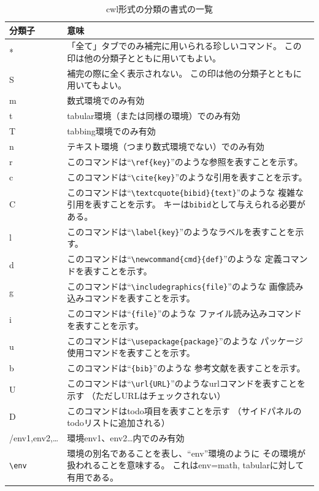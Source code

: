 \begin{table}[H]
  \centering
  \caption{cwl形式の分類の書式の一覧}
  \begin{tabularx}{\linewidth}{lX}
    \hline
    \textbf{分類子} & \textbf{意味}\\
    \hline
    * & 「全て」タブでのみ補完に用いられる珍しいコマンド。
      この印は他の分類子とともに用いてもよい。\\
    S & 補完の際に全く表示されない。 この印は他の分類子とともに用いてもよい。\\
    m & 数式環境でのみ有効\\
    t & tabular環境（または同様の環境）でのみ有効\\
    T & tabbing環境でのみ有効\\
    n & テキスト環境（つまり数式環境でない）でのみ有効\\
    r & このコマンドは``\verb+\ref+\verb+{key}+''のような参照を表すことを示す。\\
    c & このコマンドは``\verb+\cite+\verb+{key}+''のような引用を表すことを示す。\\
    C & このコマンドは``\verb+\textcquote+\verb+{bibid}{text}+''のような
      複雑な引用を表すことを示す。
      キーは\verb+bibid+として与えられる必要がある。\\
    l & このコマンドは``\verb+\label+\verb+{key}+''のようなラベルを表すことを示す。\\
    d & このコマンドは``\verb+\newcommand+\verb+{cmd}{def}+''のような
      定義コマンドを表すことを示す。\\
    g & このコマンドは``\verb+\includegraphics+\verb+{file}+''のような
      画像読み込みコマンドを表すことを示す。\\
    i & このコマンドは``\verb++\verb+{file}+''のような
      ファイル読み込みコマンドを表すことを示す。\\
    u & このコマンドは``\verb+\usepackage+\verb+{package}+''のような
      パッケージ使用コマンドを表すことを示す。\\
    b & このコマンドは``\verb++\verb+{bib}+''のような
      参考文献を表すことを示す。\\
    U & このコマンドは``\verb+\url+\verb+{URL}+''のようなurlコマンドを表すことを示す
      （ただしURLはチェックされない）\\
    D & このコマンドはtodo項目を表すことを示す
      （サイドパネルのtodoリストに追加される）\\
    /env1,env2,\ldots{} & 環境env1、env2\ldots{}内でのみ有効\\
    \verb+\env+ & 環境の別名であることを表し、``env''環境のように
      その環境が扱われることを意味する。
      これはenv=math, tabularに対して有用である。\\
    \hline
  \end{tabularx}
\end{table}

